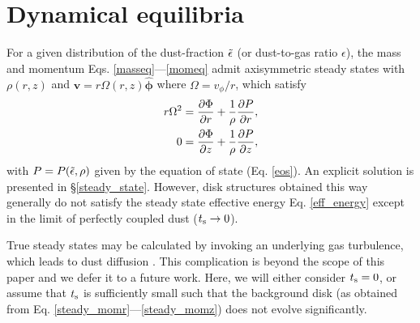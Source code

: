 \section{Dynamical equilibria}\label{eqm}
 
For a given distribution of the dust-fraction $\tilde{\epsilon}$ (or
dust-to-gas ratio $\epsilon$), the 
mass and momentum Eqs. \ref{masseq}---\ref{momeq} admit     
axisymmetric steady states with $\rho(r,z)$ and 
$\bm{v}=r\Omega(r,z)\hat{\bm{\phi}}$ where $\Omega = v_\phi/r$, which satisfy 
\begin{align}
  r\Omega^2 &= \frac{\partial \Phi}{\partial r} + \frac{1}{\rho}\frac{\partial P}{\partial
    r},\label{steady_momr}\\
  0 & = \frac{\partial\Phi}{\partial z} + \frac{1}{\rho}\frac{\partial P}{\partial z},\label{steady_momz}
\end{align}
with $P=P(\tilde{\epsilon},\rho)$ given by the equation of state
(Eq. \ref{eos}). An explicit solution is presented in
\S\ref{steady_state}.  
However, disk structures obtained this way generally do not satisfy 
the steady state effective energy Eq. \ref{eff_energy} 
except in the limit of perfectly coupled dust ($t_\mathrm{s}\to0$).  

True steady states may be calculated by invoking an underlying gas
turbulence, which leads to dust diffusion \citep{takeuchi02, youdin07, 
  lyra13}. This complication is beyond the scope of this paper and we 
defer it to a future work. Here, we will either consider $t_\mathrm{s} = 0$,
or assume that $t_\mathrm{s}$ is sufficiently small such that the background
disk (as obtained from Eq. \ref{steady_momr}---\ref{steady_momz}) does 
not evolve significantly.  %


